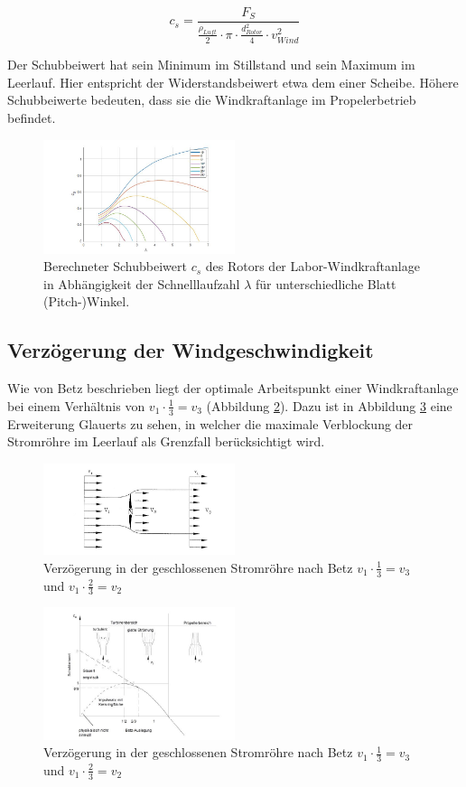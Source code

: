 \begin{equation}
  c_{s}= \frac{F_{S}}{\frac{\rho_{Luft}}{2}\cdot \pi \cdot \frac{d^2_{Rotor}}{4} \cdot v^2_{Wind}}
    \label{eq:Schubbeiwert_cs}
\end{equation}

Der Schubbeiwert hat sein Minimum im Stillstand und sein Maximum im Leerlauf. Hier entspricht der Widerstandsbeiwert etwa dem einer Scheibe. Höhere Schubbeiwerte bedeuten, dass sie die Windkraftanlage im Propelerbetrieb befindet.\cite{Anleitung}

\begin{figure}[!ht]
    \centering
    \includegraphics[width=0.5\textwidth]{Abbildungen/cszulambda.jpg}
    \caption{Berechneter Schubbeiwert $c_{s}$ des Rotors der Labor-Windkraftanlage in Abhängigkeit der Schnelllaufzahl $\lambda$ für unterschiedliche Blatt (Pitch-)Winkel.\cite{Anleitung}}
    \label{fig:cszulambda}
  \end{figure}

  \subsection{Verzögerung der Windgeschwindigkeit}
Wie von Betz beschrieben liegt der optimale Arbeitspunkt einer Windkraftanlage bei einem Verhältnis von $v_{1} \cdot \frac{1}{3}=v_{3}$  (Abbildung \ref{fig:Betz2905}). Dazu ist in Abbildung \ref{fig:Glauert} eine Erweiterung Glauerts zu sehen, in welcher die maximale Verblockung der Stromröhre im Leerlauf als Grenzfall berücksichtigt wird.

\begin{figure}[h!]
    \centering
    \includegraphics[width=0.5\textwidth]{Abbildungen/Betz.jpg}
    \caption{Verzögerung in der geschlossenen Stromröhre nach Betz $v_{1} \cdot \frac{1}{3}=v_{3}$ und  $v_{1} \cdot \frac{2}{3}=v_{2} $ \cite{Anleitung}}
    \label{fig:Betz2905}
\end{figure}

\begin{figure}[h!]
    \centering
    \includegraphics[width=0.5\textwidth]{Abbildungen/Glauert.jpg}
    \caption{Verzögerung in der geschlossenen Stromröhre nach Betz $v_{1} \cdot \frac{1}{3}=v_{3}$ und  $v_{1} \cdot \frac{2}{3}=v_{2} $\cite{Anleitung}}
    \label{fig:Glauert}
\end{figure}
